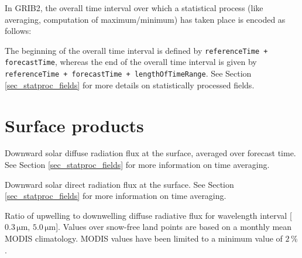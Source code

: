 In GRIB2, the overall time interval over which a statistical process (like averaging, computation of maximum/minimum) has taken place is 
encoded as follows:

The beginning of the overall time interval is defined by \texttt{referenceTime + forecastTime}, whereas the end of the 
overall time interval is given by \texttt{referenceTime + forecastTime + lengthOfTimeRange}. See Section 
\ref{sec_statproc_fields} for more details on statistically processed fields.




\section{Surface products}
\begin{description}[leftmargin=3.0cm,style=sameline]
 \item [ASWDIFD\_S] Downward solar diffuse radiation flux at the surface, averaged over forecast time. See Section 
                    \ref{sec_statproc_fields} for more information on time averaging. 
 
 \item [ASWDIR\_S] Downward solar direct radiation flux at the surface. See Section \ref{sec_statproc_fields} for more information 
                   on time averaging.
                   
 \item [ALB\_RAD] Ratio of upwelling to downwelling diffuse radiative flux for wavelength interval [$0.3\,\mathrm{\mu m},\,5.0\,\mathrm{\mu m}$]. 
                  Values over snow-free land points are based on a monthly mean MODIS climatology. MODIS values have been limited to a minimum value 
                  of $2\,\%$.  
\end{description}

